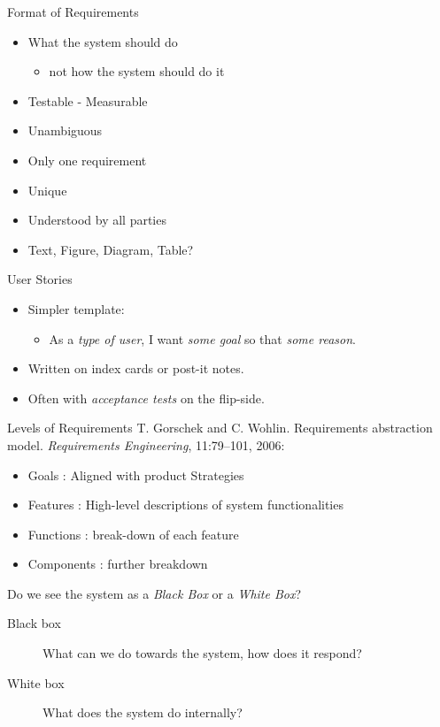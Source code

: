 \documentclass[10pt,t,a4paper]{beamer}
\begin{document}
\begin{frame}[label=sec-1-11]{Format of Requirements}
\begin{itemize}
\item What the system should do
\begin{itemize}
\item not how the system should do it
\end{itemize}
\item Testable - Measurable
\item Unambiguous
\item Only one requirement
\item Unique
\item Understood by all parties

\item Text, Figure, Diagram, Table?
\end{itemize}
\end{frame}
\begin{frame}[label=sec-1-12]{User Stories}
\begin{itemize}
\item Simpler template:
\begin{itemize}
\item As a \emph{type of user}, I want \emph{some goal} so that \emph{some reason}.
\end{itemize}
\item Written on index cards or post-it notes.
\item Often with \emph{acceptance tests} on the flip-side.
\end{itemize}
\end{frame}
\begin{frame}[label=sec-1-13]{Levels of Requirements}
T. Gorschek and C. Wohlin. Requirements abstraction model. \emph{Requirements Engineering}, 11:79–101, 2006:

\begin{itemize}
\item \alert{Goals} : Aligned with product Strategies
\item \alert{Features} : High-level descriptions of system functionalities
\item \alert{Functions} :  break-down of each feature
\item \alert{Components} : further breakdown
\end{itemize}

Do we see the system as a \emph{Black Box} or a \emph{White Box}?
\begin{description}
\item[{Black box}] What can we do towards the system, how does it respond?
\item[{White box}] What does the system do internally?
\end{description}
\end{frame}
\end{document}
